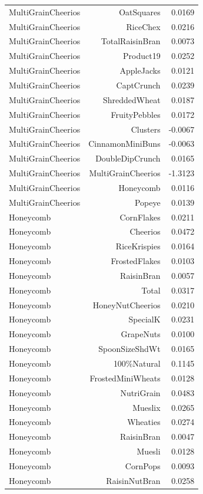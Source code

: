 \begin{longtable}{@{}lrr@{}}
MultiGrainCheerios & OatSquares & 0.0169 \\
MultiGrainCheerios & RiceChex & 0.0216 \\
MultiGrainCheerios & TotalRaisinBran & 0.0073 \\
MultiGrainCheerios & Product19 & 0.0252 \\
MultiGrainCheerios & AppleJacks & 0.0121 \\
MultiGrainCheerios & CaptCrunch & 0.0239 \\
MultiGrainCheerios & ShreddedWheat & 0.0187 \\
MultiGrainCheerios & FruityPebbles & 0.0172 \\
MultiGrainCheerios & Clusters & -0.0067 \\
MultiGrainCheerios & CinnamonMiniBuns & -0.0063 \\
MultiGrainCheerios & DoubleDipCrunch & 0.0165 \\
MultiGrainCheerios & MultiGrainCheerios & -1.3123 \\
MultiGrainCheerios & Honeycomb & 0.0116 \\
MultiGrainCheerios & Popeye & 0.0139 \\
Honeycomb & CornFlakes & 0.0211 \\
Honeycomb & Cheerios & 0.0472 \\
Honeycomb & RiceKrispies & 0.0164 \\
Honeycomb & FrostedFlakes & 0.0103 \\
Honeycomb & RaisinBran & 0.0057 \\
Honeycomb & Total & 0.0317 \\
Honeycomb & HoneyNutCheerios & 0.0210 \\
Honeycomb & SpecialK & 0.0231 \\
Honeycomb & GrapeNuts & 0.0100 \\
Honeycomb & SpoonSizeShdWt & 0.0165 \\
Honeycomb & 100\%Natural & 0.1145 \\
Honeycomb & FrostedMiniWheats & 0.0128 \\
Honeycomb & NutriGrain & 0.0483 \\
Honeycomb & Mueslix & 0.0265 \\
Honeycomb & Wheaties & 0.0274 \\
Honeycomb & RaisinBran & 0.0047 \\
Honeycomb & Muesli & 0.0128 \\
Honeycomb & CornPops & 0.0093 \\
Honeycomb & RaisinNutBran & 0.0258 \\

\end{longtable}
